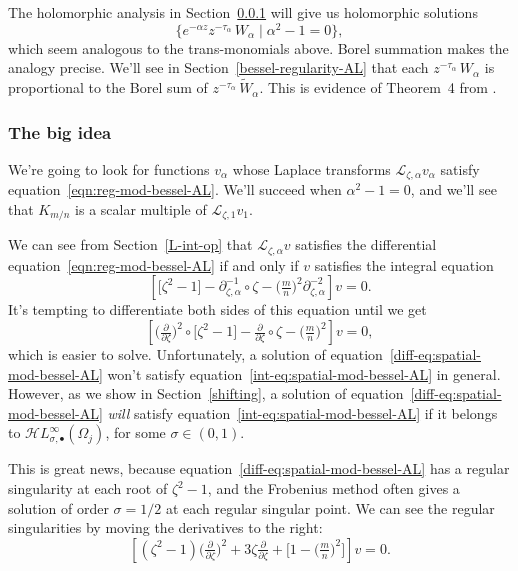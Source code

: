 \documentclass{article}
\newcommand{\singexp}[2]{\mathcal{H}L^\infty_{#1, #2}}
\newcommand{\singexpalg}[1]{\singexp{#1}{\bullet}}
\newcommand{\series}[1]{\tilde{#1}}
\newcommand{\fracderiv}[3]{\partial^{#1}_{#2, #3}}
\newcommand{\laplace}{\mathcal{L}}
\theoremstyle{definition}
\theoremstyle{plain}
\begin{document}
{The holomorphic analysis in Section~\ref{big-idea} will give us holomorphic solutions
\[ \{ e^{-\alpha z} z^{-\tau_\alpha}\,W_\alpha \mid \alpha^2 - 1 = 0 \}, \]
which seem analogous to the trans-monomials above. Borel summation makes the analogy precise. We’ll see in Section~\ref{bessel-regularity-AL} that each $z^{-\tau_\alpha}\,W_\alpha$ is proportional to the Borel sum of $z^{-\tau_\alpha}\,\series{W}_\alpha$. This is evidence of Theorem~4 from \cite{reg-sing-volterra}.
\subsubsection{The big idea}\label{big-idea}
We're going to look for functions $v_\alpha$ whose Laplace transforms $\laplace_{\zeta, \alpha} v_\alpha$ satisfy equation~\eqref{eqn:reg-mod-bessel-AL}. We'll succeed when $\alpha^2 - 1 = 0$, and we'll see that $K_{m/n}$ is a scalar multiple of $\laplace_{\zeta, 1} v_1$.

We can see from Section~\ref{L-int-op} that $\laplace_{\zeta, \alpha} v$ satisfies the differential equation~\eqref{eqn:reg-mod-bessel-AL} if and only if $v$ satisfies the integral equation
\begin{equation}\label{int-eq:spatial-mod-bessel-AL}
\left[ \big[ \zeta^2 - 1 \big] - \fracderiv{-1}{\zeta}{\alpha} \circ \zeta - \big(\tfrac{m}{n}\big)^2 \fracderiv{-2}{\zeta}{\alpha} \right] v = 0.
\end{equation}
It's tempting to differentiate both sides of this equation until we get
\begin{equation}\label{diff-eq:spatial-mod-bessel-AL}
\left[ \big(\tfrac{\partial}{\partial \zeta}\big)^2 \circ \big[ \zeta^2 - 1 \big] - \tfrac{\partial}{\partial \zeta} \circ \zeta - \big(\tfrac{m}{n}\big)^2 \right] v = 0,
\end{equation}
which is easier to solve. Unfortunately, a solution of equation~\eqref{diff-eq:spatial-mod-bessel-AL} won't satisfy equation~\eqref{int-eq:spatial-mod-bessel-AL} in general. However, as we show in Section~\ref{shifting}, a solution of equation~\eqref{diff-eq:spatial-mod-bessel-AL} {\em will} satisfy equation~\eqref{int-eq:spatial-mod-bessel-AL} if it belongs to $\singexpalg{\sigma}(\Omega_j)$, for some $\sigma\in (0,1)$.

This is great news, because equation~\eqref{diff-eq:spatial-mod-bessel-AL} has a regular singularity at each root of $\zeta^2 - 1$, and the Frobenius method often gives a solution of order $\sigma=1/2$ at each regular singular point. We can see the regular singularities by moving the derivatives to the right:
\[ \left[ (\zeta^2 - 1) \big(\tfrac{\partial}{\partial \zeta}\big)^2 + 3\zeta \tfrac{\partial}{\partial \zeta} + \big[ 1 - \big(\tfrac{m}{n}\big)^2 \big] \right] v = 0. \]

}
\end{document}
